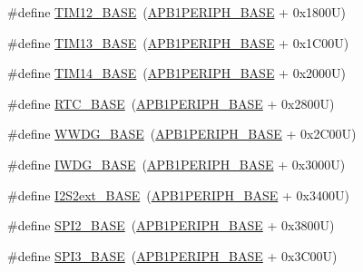 \begin{DoxyCompactItemize}
\item 
\#define \hyperlink{group___peripheral__memory__map_ga33dea32fadbaecea161c2ef7927992fd}{T\+I\+M12\+\_\+\+B\+A\+SE}~(\hyperlink{group___peripheral__memory__map_ga45666d911f39addd4c8c0a0ac3388cfb}{A\+P\+B1\+P\+E\+R\+I\+P\+H\+\_\+\+B\+A\+SE} + 0x1800\+U)
\item 
\#define \hyperlink{group___peripheral__memory__map_gad20f79948e9359125a40bbf6ed063590}{T\+I\+M13\+\_\+\+B\+A\+SE}~(\hyperlink{group___peripheral__memory__map_ga45666d911f39addd4c8c0a0ac3388cfb}{A\+P\+B1\+P\+E\+R\+I\+P\+H\+\_\+\+B\+A\+SE} + 0x1\+C00\+U)
\item 
\#define \hyperlink{group___peripheral__memory__map_ga862855347d6e1d92730dfe17ee8e90b8}{T\+I\+M14\+\_\+\+B\+A\+SE}~(\hyperlink{group___peripheral__memory__map_ga45666d911f39addd4c8c0a0ac3388cfb}{A\+P\+B1\+P\+E\+R\+I\+P\+H\+\_\+\+B\+A\+SE} + 0x2000\+U)
\item 
\#define \hyperlink{group___peripheral__memory__map_ga4265e665d56225412e57a61d87417022}{R\+T\+C\+\_\+\+B\+A\+SE}~(\hyperlink{group___peripheral__memory__map_ga45666d911f39addd4c8c0a0ac3388cfb}{A\+P\+B1\+P\+E\+R\+I\+P\+H\+\_\+\+B\+A\+SE} + 0x2800\+U)
\item 
\#define \hyperlink{group___peripheral__memory__map_ga9a5bf4728ab93dea5b569f5b972cbe62}{W\+W\+D\+G\+\_\+\+B\+A\+SE}~(\hyperlink{group___peripheral__memory__map_ga45666d911f39addd4c8c0a0ac3388cfb}{A\+P\+B1\+P\+E\+R\+I\+P\+H\+\_\+\+B\+A\+SE} + 0x2\+C00\+U)
\item 
\#define \hyperlink{group___peripheral__memory__map_ga8543ee4997296af5536b007cd4748f55}{I\+W\+D\+G\+\_\+\+B\+A\+SE}~(\hyperlink{group___peripheral__memory__map_ga45666d911f39addd4c8c0a0ac3388cfb}{A\+P\+B1\+P\+E\+R\+I\+P\+H\+\_\+\+B\+A\+SE} + 0x3000\+U)
\item 
\#define \hyperlink{group___peripheral__memory__map_gaa5f7b241ed5b756decd835300c9e7bc9}{I2\+S2ext\+\_\+\+B\+A\+SE}~(\hyperlink{group___peripheral__memory__map_ga45666d911f39addd4c8c0a0ac3388cfb}{A\+P\+B1\+P\+E\+R\+I\+P\+H\+\_\+\+B\+A\+SE} + 0x3400\+U)
\item 
\#define \hyperlink{group___peripheral__memory__map_gac3e357b4c25106ed375fb1affab6bb86}{S\+P\+I2\+\_\+\+B\+A\+SE}~(\hyperlink{group___peripheral__memory__map_ga45666d911f39addd4c8c0a0ac3388cfb}{A\+P\+B1\+P\+E\+R\+I\+P\+H\+\_\+\+B\+A\+SE} + 0x3800\+U)
\item 
\#define \hyperlink{group___peripheral__memory__map_gae634fe8faa6922690e90fbec2fc86162}{S\+P\+I3\+\_\+\+B\+A\+SE}~(\hyperlink{group___peripheral__memory__map_ga45666d911f39addd4c8c0a0ac3388cfb}{A\+P\+B1\+P\+E\+R\+I\+P\+H\+\_\+\+B\+A\+SE} + 0x3\+C00\+U)

\end{DoxyCompactItemize}
